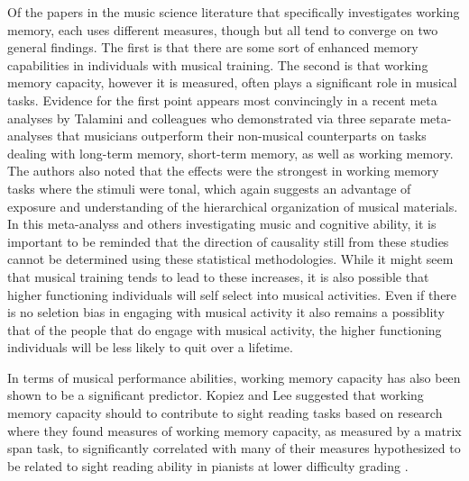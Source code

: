 \documentclass[]{book}
\theoremstyle{definition}
\theoremstyle{definition}
\theoremstyle{definition}
\theoremstyle{remark}
\begin{document}
Of the papers in the music science literature that specifically
investigates working memory, each uses different measures, though but
all tend to converge on two general findings. The first is that there
are some sort of enhanced memory capabilities in individuals with
musical training. The second is that working memory capacity, however it
is measured, often plays a significant role in musical tasks. Evidence
for the first point appears most convincingly in a recent meta analyses
by Talamini and colleagues \citep{talaminiMusiciansHaveBetter2017} who
demonstrated via three separate meta-analyses that musicians outperform
their non-musical counterparts on tasks dealing with long-term memory,
short-term memory, as well as working memory. The authors also noted
that the effects were the strongest in working memory tasks where the
stimuli were tonal, which again suggests an advantage of exposure and
understanding of the hierarchical organization of musical materials. In
this meta-analyss and others investigating music and cognitive ability,
it is important to be reminded that the direction of causality still
from these studies cannot be determined using these statistical
methodologies. While it might seem that musical training tends to lead
to these increases, it is also possible that higher functioning
individuals will self select into musical activities. Even if there is
no seletion bias in engaging with musical activity it also remains a
possiblity that of the people that do engage with musical activity, the
higher functioning individuals will be less likely to quit over a
lifetime.

In terms of musical performance abilities, working memory capacity has
also been shown to be a significant predictor. Kopiez and Lee suggested
that working memory capacity should to contribute to sight reading tasks
based on research where they found measures of working memory capacity,
as measured by a matrix span task, to significantly correlated with many
of their measures hypothesized to be related to sight reading ability in
pianists at lower difficulty grading
\citep{kopiezDynamicModelSkills2006, kopiezGeneralModelSkills2008}.
\end{document}
